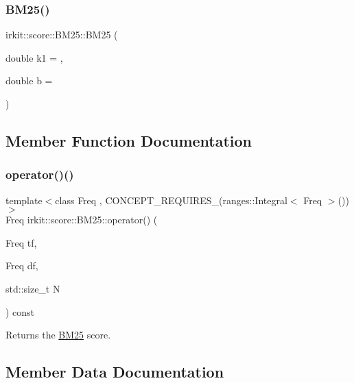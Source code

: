 \subsubsection{\texorpdfstring{B\+M25()}{BM25()}}
{\footnotesize\ttfamily irkit\+::score\+::\+B\+M25\+::\+B\+M25 (\begin{DoxyParamCaption}\item[{double}]{k1 = {},  }\item[{double}]{b = {} }\end{DoxyParamCaption})\hspace{0.3cm}{\ttfamily [inline]}}



\subsection{Member Function Documentation}
\mbox{\label{structirkit_1_1score_1_1BM25_a11129a12cf8c95384d6ceb23b68f39ed}} 
\subsubsection{\texorpdfstring{operator()()}{operator()()}}
{\footnotesize\ttfamily template$<$class Freq , C\+O\+N\+C\+E\+P\+T\+\_\+\+R\+E\+Q\+U\+I\+R\+E\+S\+\_\+(ranges\+::\+Integral$<$ Freq $>$()) $>$ \\
Freq irkit\+::score\+::\+B\+M25\+::operator() (\begin{DoxyParamCaption}\item[{Freq}]{tf,  }\item[{Freq}]{df,  }\item[{std\+::size\+\_\+t}]{N }\end{DoxyParamCaption}) const\hspace{0.3cm}{\ttfamily [inline]}}



Returns the \hyperlink{structirkit_1_1score_1_1BM25}{B\+M25} score. 



\subsection{Member Data Documentation}
\mbox{\label{structirkit_1_1score_1_1BM25_ab68733f61f341e9fe744540192ae5b7c}} 
